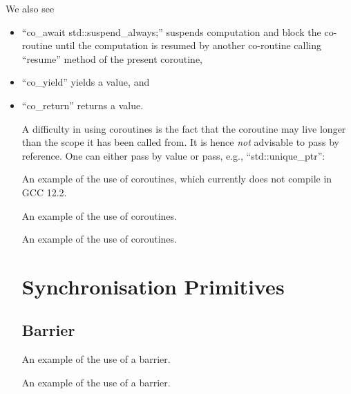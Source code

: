 We also see 
\begin{itemize}
\item ``co_await std::suspend_always{};'' suspends computation and block the co-routine until the computation is resumed by another co-routine calling ``resume'' method of the present coroutine,
\item ``co_yield'' yields a value, and 
\item ``co_return'' returns a value. 
\begin{end}

A difficulty in using coroutines is the fact that the coroutine may live longer than the scope it has been called from. It is hence \emph{not} advisable to pass by reference. One can either pass by value or pass, e.g., ``std::unique_ptr'':

\raggedbottom
\begin{codebox}[]{}{}
\footnotesize An example of the use of coroutines, which currently does not compile in GCC 12.2.
\tcblower
{}
\end{codebox}

\raggedbottom
\begin{codebox}[]{\href{https://godbolt.org/z/1nYdMPh3z}{\ExternalLink}}
\footnotesize An example of the use of coroutines.
\tcblower
{}
\end{codebox}

\raggedbottom
\begin{codebox}[]{\href{https://godbolt.org/z/}{\ExternalLink}}
\footnotesize An example of the use of coroutines.
\tcblower
{}
\end{codebox}

\section{Synchronisation Primitives}

\subsection{Barrier}

\raggedbottom
\begin{codebox}[]{\href{https://godbolt.org/z/}{\ExternalLink}}
\footnotesize An example of the use of a barrier.
\tcblower
{}
\end{codebox}

\raggedbottom
\begin{codebox}[]{\href{https://godbolt.org/z/}{\ExternalLink}}
\footnotesize An example of the use of a barrier.
\tcblower
{}
\end{codebox}


\end{end}
\end{itemize}
